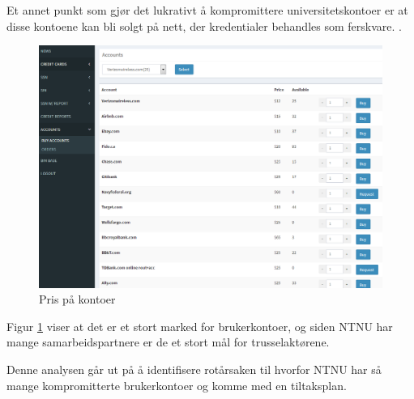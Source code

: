 Et annet punkt som gjør det lukrativt å kompromittere universitetskontoer er at disse kontoene kan bli solgt på nett, der kredentialer behandles som ferskvare. \cite{PrisKonto}. 
\begin{figure}[H]
    \centering
    \includegraphics[scale=0.3]{case_2/bilder/prislite_kontore.png}
    \caption[Pris på kontoer]{Pris på kontoer}
    \label{fig:pris-kontoer}
\end{figure}

Figur \ref{fig:pris-kontoer} viser at det er et stort marked for brukerkontoer, og siden NTNU har mange samarbeidspartnere er de et stort mål for trusselaktørene. 

Denne analysen går ut på å identifisere rotårsaken til hvorfor NTNU har så mange kompromitterte brukerkontoer og komme med en tiltaksplan.
